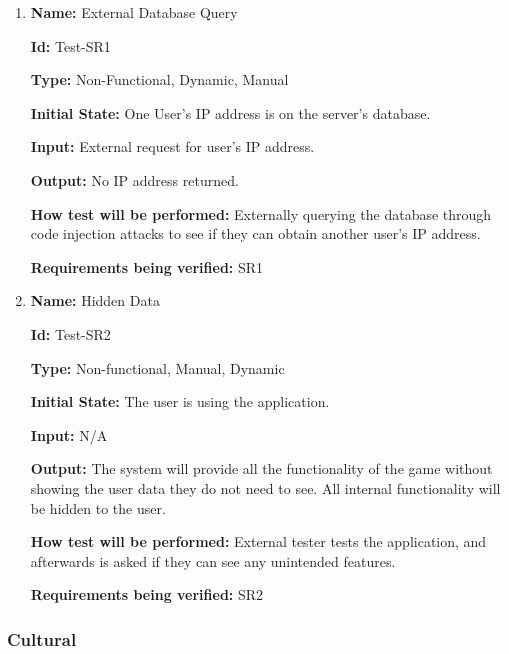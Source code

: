 \documentclass[12pt, titlepage]{article}
\begin{document}
\begin{enumerate}

\item{\textbf{Name:} External Database Query}

\textbf{Id:} Test-SR1

\textbf{Type:} Non-Functional, Dynamic, Manual
					
\textbf{Initial State:} One User's IP address is on the server's database.
					
\textbf{Input:} External request for user's IP address.
					
\textbf{Output:} No IP address returned.
					
\textbf{How test will be performed:} Externally querying the database through code injection attacks to see if they can obtain another user's IP address.

\textbf{Requirements being verified:} SR1
					
\item{\textbf{Name:} Hidden Data}

\textbf{Id:} Test-SR2

\textbf{Type:} Non-functional, Manual, Dynamic
					
\textbf{Initial State:} The user is using the application.
					
\textbf{Input:} N/A
					
\textbf{Output:} The system will provide all the functionality of the game without showing the user data they do not need to see. All internal functionality will be hidden to the user.
					
\textbf{How test will be performed:} External tester tests the application, and afterwards is asked if they can see any unintended features.

\textbf{Requirements being verified:} SR2

\end{enumerate}

\subsubsection{Cultural}
\end{document}
